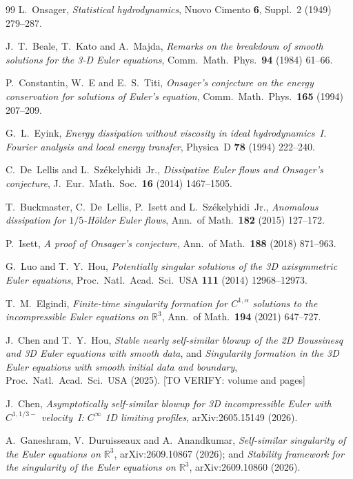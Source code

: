 \documentclass[11pt]{article}
\begin{document}
\begin{thebibliography}{99}
 L.~Onsager, \emph{Statistical hydrodynamics}, Nuovo Cimento \textbf{6},
Suppl.~2 (1949) 279--287.

 J.~T.~Beale, T.~Kato and A.~Majda, \emph{Remarks on the breakdown of smooth solutions
for the 3-D Euler equations}, Comm.\ Math.\ Phys.\ \textbf{94} (1984) 61--66.

 P.~Constantin, W.~E and E.~S.~Titi, \emph{Onsager's conjecture on the energy
conservation for solutions of Euler's equation}, Comm.\ Math.\ Phys.\ \textbf{165} (1994) 207--209.

 G.~L.~Eyink, \emph{Energy dissipation without viscosity in ideal hydrodynamics~I.
Fourier analysis and local energy transfer}, Physica~D \textbf{78} (1994) 222--240.

 C.~De~Lellis and L.~Sz\'ekelyhidi~Jr., \emph{Dissipative Euler flows and Onsager's
conjecture}, J.\ Eur.\ Math.\ Soc.\ \textbf{16} (2014) 1467--1505.

 T.~Buckmaster, C.~De~Lellis, P.~Isett and L.~Sz\'ekelyhidi~Jr., \emph{Anomalous
dissipation for $1/5$-H\"older Euler flows}, Ann.\ of Math.\ \textbf{182} (2015) 127--172.

 P.~Isett, \emph{A proof of Onsager's conjecture}, Ann.\ of Math.\ \textbf{188}
(2018) 871--963.

 G.~Luo and T.~Y.~Hou, \emph{Potentially singular solutions of the 3D axisymmetric
Euler equations}, Proc.\ Natl.\ Acad.\ Sci.\ USA \textbf{111} (2014) 12968--12973.

 T.~M.~Elgindi, \emph{Finite-time singularity formation for $C^{1,\alpha}$
solutions to the incompressible Euler equations on $\mathbb{R}^3$}, Ann.\ of Math.\ \textbf{194}
(2021) 647--727.

 J.~Chen and T.~Y.~Hou, \emph{Stable nearly self-similar blowup of the 2D
Boussinesq and 3D Euler equations with smooth data}, and \emph{Singularity formation in the 3D Euler
equations with smooth initial data and boundary}, Proc.\ Natl.\ Acad.\ Sci.\ USA (2025).
[TO VERIFY: volume and pages]

 J.~Chen, \emph{Asymptotically self-similar blowup for 3D incompressible Euler
with $C^{1,1/3-}$ velocity~I: $C^\infty$ 1D limiting profiles}, arXiv:2605.15149 (2026).

 A.~Ganeshram, V.~Duruisseaux and A.~Anandkumar, \emph{Self-similar singularity of
the Euler equations on $\mathbb{R}^3$}, arXiv:2609.10867 (2026); and \emph{Stability framework for
the singularity of the Euler equations on $\mathbb{R}^3$}, arXiv:2609.10860 (2026).

\end{thebibliography}
\end{document}
